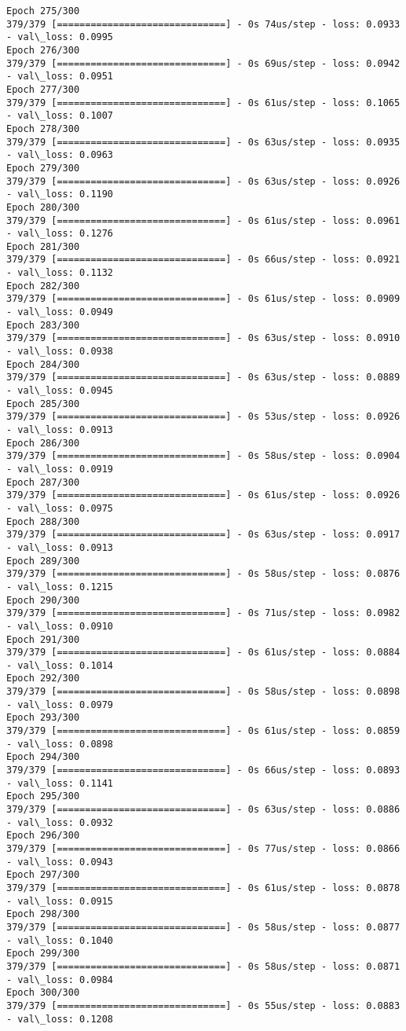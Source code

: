 \documentclass[11pt]{article}
\begin{document}
\begin{Verbatim}[commandchars=\\\{\}]
Epoch 275/300
379/379 [==============================] - 0s 74us/step - loss: 0.0933 - val\_loss: 0.0995
Epoch 276/300
379/379 [==============================] - 0s 69us/step - loss: 0.0942 - val\_loss: 0.0951
Epoch 277/300
379/379 [==============================] - 0s 61us/step - loss: 0.1065 - val\_loss: 0.1007
Epoch 278/300
379/379 [==============================] - 0s 63us/step - loss: 0.0935 - val\_loss: 0.0963
Epoch 279/300
379/379 [==============================] - 0s 63us/step - loss: 0.0926 - val\_loss: 0.1190
Epoch 280/300
379/379 [==============================] - 0s 61us/step - loss: 0.0961 - val\_loss: 0.1276
Epoch 281/300
379/379 [==============================] - 0s 66us/step - loss: 0.0921 - val\_loss: 0.1132
Epoch 282/300
379/379 [==============================] - 0s 61us/step - loss: 0.0909 - val\_loss: 0.0949
Epoch 283/300
379/379 [==============================] - 0s 63us/step - loss: 0.0910 - val\_loss: 0.0938
Epoch 284/300
379/379 [==============================] - 0s 63us/step - loss: 0.0889 - val\_loss: 0.0945
Epoch 285/300
379/379 [==============================] - 0s 53us/step - loss: 0.0926 - val\_loss: 0.0913
Epoch 286/300
379/379 [==============================] - 0s 58us/step - loss: 0.0904 - val\_loss: 0.0919
Epoch 287/300
379/379 [==============================] - 0s 61us/step - loss: 0.0926 - val\_loss: 0.0975
Epoch 288/300
379/379 [==============================] - 0s 63us/step - loss: 0.0917 - val\_loss: 0.0913
Epoch 289/300
379/379 [==============================] - 0s 58us/step - loss: 0.0876 - val\_loss: 0.1215
Epoch 290/300
379/379 [==============================] - 0s 71us/step - loss: 0.0982 - val\_loss: 0.0910
Epoch 291/300
379/379 [==============================] - 0s 61us/step - loss: 0.0884 - val\_loss: 0.1014
Epoch 292/300
379/379 [==============================] - 0s 58us/step - loss: 0.0898 - val\_loss: 0.0979
Epoch 293/300
379/379 [==============================] - 0s 61us/step - loss: 0.0859 - val\_loss: 0.0898
Epoch 294/300
379/379 [==============================] - 0s 66us/step - loss: 0.0893 - val\_loss: 0.1141
Epoch 295/300
379/379 [==============================] - 0s 63us/step - loss: 0.0886 - val\_loss: 0.0932
Epoch 296/300
379/379 [==============================] - 0s 77us/step - loss: 0.0866 - val\_loss: 0.0943
Epoch 297/300
379/379 [==============================] - 0s 61us/step - loss: 0.0878 - val\_loss: 0.0915
Epoch 298/300
379/379 [==============================] - 0s 58us/step - loss: 0.0877 - val\_loss: 0.1040
Epoch 299/300
379/379 [==============================] - 0s 58us/step - loss: 0.0871 - val\_loss: 0.0984
Epoch 300/300
379/379 [==============================] - 0s 55us/step - loss: 0.0883 - val\_loss: 0.1208

    \end{Verbatim}
\end{document}
